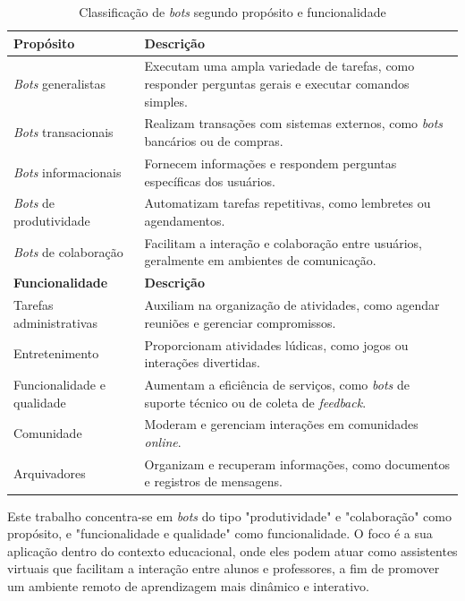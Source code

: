 \begin{table}[H]
\centering
\label{tab:classificacao_bots}
\begin{tabular}{|p{4.2cm}|p{9cm}|}
\hline
\textbf{Propósito}\cite{lebeuf2019}& \textbf{Descrição} \\
\hline
\textit{Bots} generalistas & Executam uma ampla variedade de tarefas, como
responder perguntas gerais e executar comandos simples. \\
\hline
\textit{Bots} transacionais & Realizam transações com sistemas externos, como
\textit{bots} bancários ou de compras. \\
\hline
\textit{Bots} informacionais & Fornecem informações e respondem perguntas
específicas dos usuários. \\
\hline
\textit{Bots} de produtividade & Automatizam tarefas repetitivas, como lembretes
ou agendamentos. \\
\hline
\textit{Bots} de colaboração & Facilitam a interação e colaboração entre
usuários, geralmente em ambientes de comunicação. \\
\hline
\hline
\textbf{Funcionalidade}\cite{seering2018} & \textbf{Descrição} \\
\hline
Tarefas administrativas & Auxiliam na organização de atividades, como agendar
reuniões e gerenciar compromissos. \\
\hline
Entretenimento & Proporcionam atividades lúdicas, como jogos ou interações
divertidas. \\
\hline
Funcionalidade e qualidade & Aumentam a eficiência de serviços, como
\textit{bots} de suporte técnico ou de coleta de \textit{feedback}. \\
\hline
Comunidade & Moderam e gerenciam interações em comunidades \textit{online}. \\
\hline
Arquivadores & Organizam e recuperam informações, como documentos e registros de
mensagens. \\
\hline
\end{tabular}
\caption{Classificação de \textit{bots} segundo propósito e funcionalidade}
\end{table}

\noindent Este trabalho concentra-se em \textit{bots} do tipo "produtividade" e
"colaboração" como propósito, e "funcionalidade e qualidade" como
funcionalidade. O foco é a sua aplicação dentro do contexto educacional, onde
eles podem atuar como assistentes virtuais que facilitam a interação entre
alunos e professores, a fim de promover um ambiente remoto de aprendizagem mais
dinâmico e interativo.

